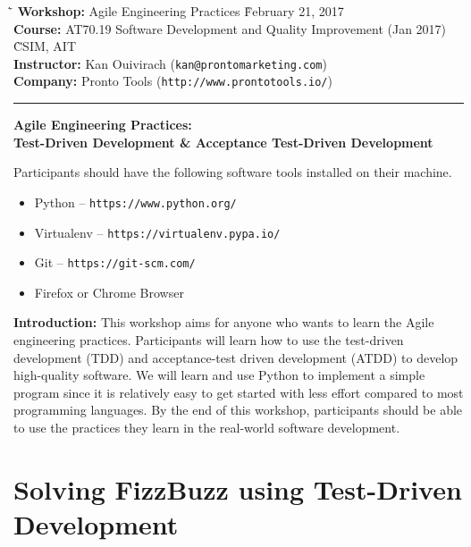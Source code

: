 \documentclass{article}
\begin{document}
\begin{tabbing}
  \`\=\kill
  \textbf{Workshop:} Agile Engineering Practices
  \` February 21, 2017 \\
  \textbf{Course:} AT70.19 Software Development and Quality Improvement (Jan
  2017) \` CSIM, AIT \\
  \textbf{Instructor:} Kan Ouivirach ({\tt \small kan@prontomarketing.com}) \\
  \textbf{Company:} Pronto Tools ({\tt \small http://www.prontotools.io/})
\end{tabbing}

\hrule

\vspace{.25in}

\begin{center}
  \textbf{\Large Agile Engineering Practices:} \\
  \vspace{.1in}
  \textbf{\large Test-Driven Development \& Acceptance Test-Driven Development}
\end{center}

\vspace{.15in}

 Participants should have the following software
tools installed on their machine.

\begin{itemize}
  \item Python -- {\tt https://www.python.org/}
  \item Virtualenv -- {\tt https://virtualenv.pypa.io/}
  \item Git -- {\tt https://git-scm.com/}
  \item Firefox or Chrome Browser
\end{itemize}

\noindent \textbf{Introduction:} This workshop aims for anyone who wants to
learn the Agile engineering practices. Participants will learn how to use the
test-driven development (TDD) and acceptance-test driven development (ATDD) to
develop high-quality software. We will learn and use Python to implement a
simple program since it is relatively easy to get started with less effort
compared to most programming languages. By the end of this workshop,
participants should be able to use the practices they learn in the real-world
software development.

\section*{Solving FizzBuzz using Test-Driven Development}
\end{document}
